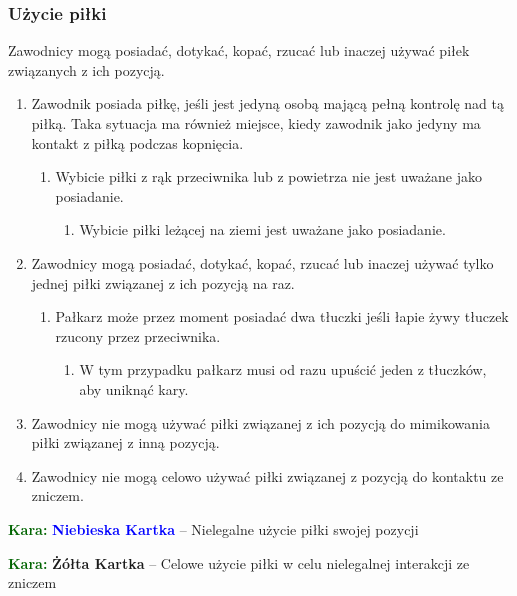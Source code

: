 \documentclass[11pt,a4paper]{article}
\newcommand\yellowcard[1]{\bgroup\textcolor{darkgreen}{\textbf{Kara: }}\bgroup\textcolor{darkyellow}{\textbf{Żółta Kartka}} -- #1}
\newcommand\bluecard[1]{\bgroup\textcolor{darkgreen}{\textbf{Kara: }}\bgroup\textcolor{blue}{\textbf{Niebieska Kartka}} -- #1}
\begin{document}
\subsubsection{Użycie piłki}
Zawodnicy mogą posiadać, dotykać, kopać, rzucać lub inaczej używać piłek związanych z ich pozycją.
\begin{enumerate}
  \item Zawodnik posiada piłkę, jeśli jest jedyną osobą mającą pełną kontrolę nad tą piłką. Taka sytuacja ma również miejsce, kiedy zawodnik jako jedyny ma kontakt z piłką podczas kopnięcia.
  \begin{enumerate}
    \item Wybicie piłki z rąk przeciwnika lub z powietrza nie jest uważane jako posiadanie.
    \begin{enumerate}
      \item Wybicie piłki leżącej na ziemi jest uważane jako posiadanie.
    \end{enumerate}
  \end{enumerate}
  \item Zawodnicy mogą posiadać, dotykać, kopać, rzucać lub inaczej używać tylko jednej piłki związanej z ich pozycją na raz.
  \begin{enumerate}
    \item Pałkarz może przez moment posiadać dwa tłuczki jeśli łapie żywy tłuczek rzucony przez przeciwnika.
    \begin{enumerate}
      \item W tym przypadku pałkarz musi od razu upuścić jeden z tłuczków, aby uniknąć kary.
    \end{enumerate}
  \end{enumerate}
  \item Zawodnicy nie mogą używać piłki związanej z ich pozycją do mimikowania piłki związanej z inną pozycją.
  \item Zawodnicy nie mogą celowo używać piłki związanej z pozycją do kontaktu ze zniczem.
\end{enumerate}

\bluecard{Nielegalne użycie piłki swojej pozycji}

\yellowcard{Celowe użycie piłki w celu nielegalnej interakcji ze zniczem}
\end{document}
